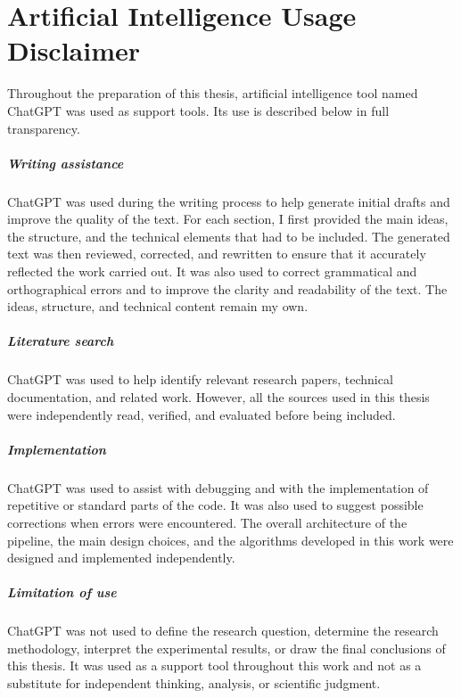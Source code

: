 \chapter*{Artificial Intelligence Usage Disclaimer}

Throughout the preparation of this thesis, artificial intelligence tool named ChatGPT was used as support tools. Its use is 
described below in full transparency.

\paragraph{Writing assistance} ChatGPT was used during the writing process to help generate initial drafts and improve the 
quality of the text. For each section, I first provided the main ideas, the structure, and the technical elements that had 
to be included. The generated text was then reviewed, corrected, and rewritten to ensure that it accurately reflected the 
work carried out. It was also used to correct grammatical and orthographical errors and to improve the clarity and 
readability of the text. The ideas, structure, and technical content remain my own.

\paragraph{Literature search} ChatGPT was used to help identify relevant research papers, technical documentation, and 
related work. However, all the sources used in this thesis were independently read, verified, and evaluated before 
being included.

\paragraph{Implementation} ChatGPT was used to assist with debugging and with the implementation of repetitive or standard 
parts of the code. It was also used to suggest possible corrections when errors were encountered. The overall architecture 
of the pipeline, the main design choices, and the algorithms developed in this work were designed and implemented 
independently.

\paragraph{Limitation of use} ChatGPT was not used to define the research question, determine the research methodology, 
interpret the experimental results, or draw the final conclusions of this thesis. It was used as a support tool 
throughout this work and not as a substitute for independent thinking, analysis, or scientific judgment.